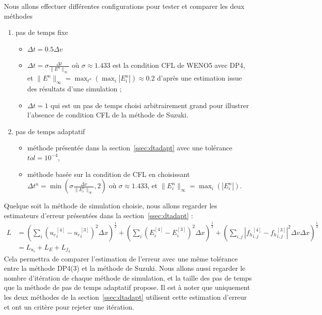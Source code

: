 Nous allons effectuer différentes configurations pour tester et comparer les deux m\'ethodes 
\begin{enumerate}
\item pas de temps fixe 
\begin{itemize}
\item  $\Delta t = 0.5\Delta v$ 
\item  $\Delta t = \sigma\frac{\Delta t}{\|E^n\|_\infty}$ où $\sigma \approx 1.433$ est la condition CFL de WENO5 avec DP4, et $\|E^n\|_\infty = \max_{t^n}(\max_i|E_i^n|) \approx 0.2$ d'après une estimation issue des résultats d'une simulation ; 
\item  $\Delta t = 1$ qui est un pas de temps choisi arbitrairement grand pour illustrer l'absence de condition CFL de la méthode de Suzuki. 
\end{itemize}
\item pas de temps adaptatif
\begin{itemize}
\item méthode présentée dans la section~\ref{ssec:dtadapt} avec une tolérance $tol = 10^{-4}$, 
\item méthode basée sur la condition de CFL en choisissant $\Delta t^n = \min\left(\sigma\frac{\Delta v}{\|E^n_i\|_\infty},2\right)$ où $\sigma \approx 1.433$, et $\|E_i^n\|_\infty = \max_i\left( |E^n_i|\right)$.
\end{itemize}
\end{enumerate}
Quelque soit la méthode de simulation choisie, nous allons regarder les estimateurs d'erreur présentées dans la section~\ref{ssec:dtadapt} :
$$
  \begin{aligned}
    L &= \left(\sum_i (\left.u_c\right.^{[4]}_i-\left.u_c\right.^{[3]}_i)^2\Delta x\right)^{\frac{1}{2}}
          + \left(\sum_i (\left.E\right.^{[4]}_i-\left.E\right.^{[3]}_i)^2\Delta x\right)^{\frac{1}{2}}
          + \left(\sum_{i,j} \left|\left.{f}_h\right.^{[4]}_{i,j}-\left.{f}_h\right.^{[3]}_{i,j}\right|^2\Delta v\Delta x\right)^{\frac{1}{2}} \\
      &= L_{u_c} + L_{E} + L_{{f}_h}
  \end{aligned}
$$
Cela permettra de comparer l'estimation de l'erreur avec une même tolérance entre la méthode DP4(3) et la méthode de Suzuki. Nous allons aussi regarder le nombre d'itération de chaque méthode de simulation, et la taille des pas de temps que la méthode de pas de temps adaptatif propose. Il est à noter que uniquement les deux méthodes de la section~\ref{ssec:dtadapt} utilisent cette estimation d'erreur et ont un critère pour rejeter une itération.

